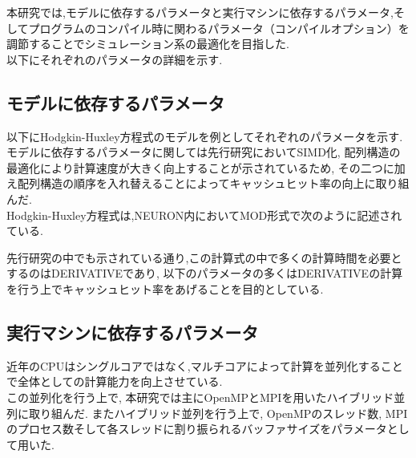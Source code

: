 \label{sec:algorithm}
本研究では,モデルに依存するパラメータと実行マシンに依存するパラメータ,そしてプログラムのコンパイル時に関わるパラメータ（コンパイルオプション）を調節することでシミュレーション系の最適化を目指した.\\
以下にそれぞれのパラメータの詳細を示す.\\
\subsection{モデルに依存するパラメータ}
以下にHodgkin-Huxley方程式のモデルを例としてそれぞれのパラメータを示す.\\
モデルに依存するパラメータに関しては先行研究\cite{miyamoto-master}においてSIMD化, 配列構造の最適化により計算速度が大きく向上することが示されているため,
その二つに加え配列構造の順序を入れ替えることによってキャッシュヒット率の向上に取り組んだ.\\
Hodgkin-Huxley方程式は,NEURON内においてMOD形式で次のように記述されている.\\
{\scriptsize

}
先行研究の中でも示されている通り,この計算式の中で多くの計算時間を必要とするのはDERIVATIVEであり,
以下のパラメータの多くはDERIVATIVEの計算を行う上でキャッシュヒット率をあげることを目的としている.\\




\subsection{実行マシンに依存するパラメータ}
近年のCPUはシングルコアではなく,マルチコアによって計算を並列化することで全体としての計算能力を向上させている.\\
この並列化を行う上で, 本研究では主にOpenMPとMPIを用いたハイブリッド並列に取り組んだ. またハイブリッド並列を行う上で,
OpenMPのスレッド数, MPIのプロセス数そして各スレッドに割り振られるバッファサイズをパラメータとして用いた.\\






